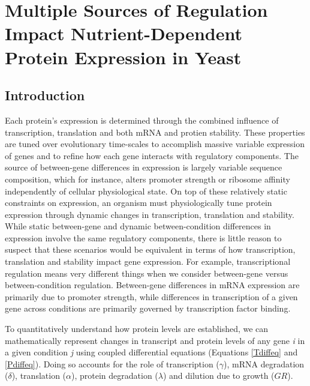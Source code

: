 \chapter{Multiple Sources of Regulation Impact Nutrient-Dependent Protein Expression in Yeast\label{ch:pt_compare}}

\section{Introduction}

Each protein's expression is determined through the combined influence of transcription, translation and both mRNA and protien stability. These properties are tuned over evolutionary time-scales to accomplish massive variable expression of genes \cite{Csardi:2015kx} and to refine how each gene interacts with regulatory components.  The source of between-gene differences in expression is largely variable sequence composition, which for instance, alters promoter strength or ribosome affinity independently of cellular physiological state. On top of these relatively static constraints on expression, an organism must physiologically tune protein expression through dynamic changes in transcription, translation and stability.  While static between-gene and dynamic between-condition differences in expression involve the same regulatory components, there is little reason to suspect that these scenarios would be equivalent in terms of how transcription, translation and stability impact gene expression.  For example, transcriptional regulation means very different things when we consider between-gene versus between-condition regulation.  Between-gene differences in mRNA expression are primarily due to promoter strength, while differences in transcription of a given gene across conditions are primarily governed by transcription factor binding.  

 
To quantitatively understand how protein levels are established, we can mathematically represent changes in transcript and protein levels of any gene \textit{i} in a given condition \textit{j} using coupled differential equations (Equations \ref{Tdiffeq} and  \ref{Pdiffeq}). Doing so accounts for the role of transcription ($\gamma$), mRNA degradation ($\delta$), translation ($\alpha$), protein degradation ($\lambda$) and dilution due to growth ($GR$).  

